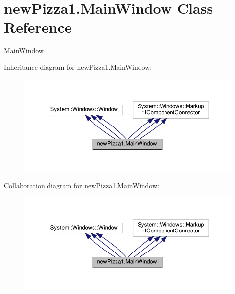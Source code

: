 \hypertarget{classnewPizza1_1_1MainWindow}{}\section{new\+Pizza1.\+Main\+Window Class Reference}
\label{classnewPizza1_1_1MainWindow}


\hyperlink{classnewPizza1_1_1MainWindow}{Main\+Window}  




Inheritance diagram for new\+Pizza1.\+Main\+Window\+:
\nopagebreak
\begin{figure}[H]
\begin{center}
\leavevmode
\includegraphics[width=350pt]{classnewPizza1_1_1MainWindow__inherit__graph}
\end{center}
\end{figure}


Collaboration diagram for new\+Pizza1.\+Main\+Window\+:
\nopagebreak
\begin{figure}[H]
\begin{center}
\leavevmode
\includegraphics[width=350pt]{classnewPizza1_1_1MainWindow__coll__graph}
\end{center}
\end{figure}
